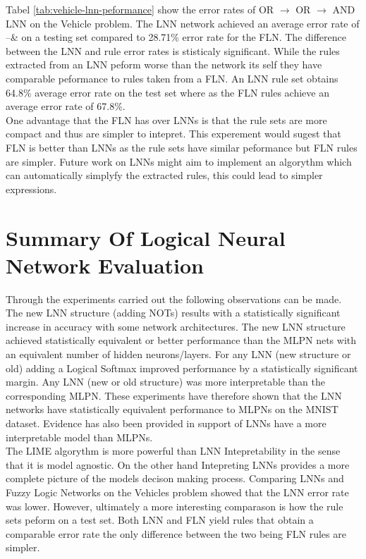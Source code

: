 Tabel \ref{tab:vehicle-lnn-peformance} show the error rates of OR $\rightarrow$ OR $\rightarrow$ AND LNN on the Vehicle problem. The LNN network achieved an average error rate of --\& on a testing set compared to 28.71\% error rate for the FLN. The difference between the LNN and rule error rates is stisticaly significant. While the rules extracted from an LNN peform worse than the network its self they have comparable peformance to rules taken from a FLN. An LNN rule set obtains 64.8\% average error rate on the test set where as the FLN rules achieve an average error rate of 67.8\%.\\

One advantage that the FLN has over LNNs is that the rule sets are more compact and thus are simpler to intepret. This experement would sugest that FLN is better than LNNs as the rule sets have similar peformance but FLN rules are simpler. Future work on LNNs might aim to implement an algorythm which can automatically simplyfy the extracted rules, this could lead to simpler expressions.

\section{Summary Of Logical Neural Network Evaluation}
Through the experiments carried out the following observations can be made. The new LNN structure (adding NOTs) results with a statistically significant increase in accuracy with some network architectures. The new LNN structure achieved statistically equivalent or better performance than the MLPN nets with an equivalent number of hidden neurons/layers. For any LNN (new structure or old) adding a Logical Softmax improved performance by a statistically significant margin. Any LNN (new or old structure) was more interpretable than the corresponding MLPN. These experiments have therefore shown that the LNN networks have statistically equivalent performance to MLPNs on the MNIST dataset. Evidence has also been provided in support of LNNs have a more interpretable model than MLPNs.\\

The LIME algorythm is more powerful than LNN Intepretability in the sense that it is model agnostic. On the other hand Intepreting LNNs provides a more complete picture of the models decison making process. Comparing LNNs and Fuzzy Logic Networks on the Vehicles problem showed that the LNN error rate was lower. However, ultimately a more interesting comparason is how the rule sets peform on a test set. Both LNN and FLN yield rules that obtain a comparable error rate the only difference between the two being FLN rules are simpler.

